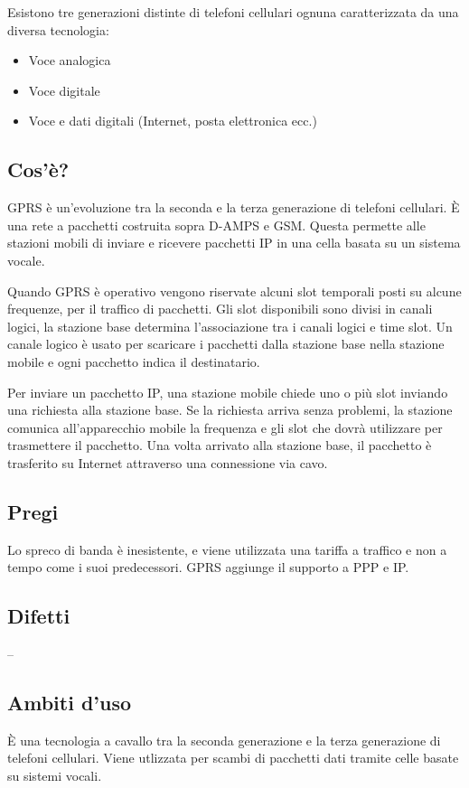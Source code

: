 Esistono tre generazioni distinte di telefoni cellulari ognuna caratterizzata da una diversa tecnologia:
\begin{itemize}
\item Voce analogica
\item Voce digitale
\item Voce e dati digitali (Internet, posta elettronica ecc.)
\end{itemize}
\subsection{Cos'è?}
GPRS è un'evoluzione tra la seconda e la terza generazione di telefoni cellulari.
È una rete a pacchetti costruita sopra D-AMPS e GSM.
Questa permette alle stazioni mobili di inviare e ricevere pacchetti IP in una cella basata su un sistema vocale.

Quando GPRS è operativo vengono riservate alcuni slot temporali posti su alcune frequenze, per il traffico di pacchetti.
Gli slot disponibili sono divisi in canali logici, la stazione base determina l'associazione tra i canali logici e time slot.
Un canale logico è usato per scaricare i pacchetti dalla stazione base nella stazione mobile e ogni pacchetto indica il destinatario.

Per inviare un pacchetto IP, una stazione mobile chiede uno o più slot inviando una richiesta alla stazione base.
Se la richiesta arriva senza problemi, la stazione comunica all'apparecchio mobile la frequenza e gli slot che dovrà utilizzare per trasmettere il pacchetto.
Una volta arrivato alla stazione base, il pacchetto è trasferito su Internet attraverso una connessione via cavo.

\subsection{Pregi}
Lo spreco di banda è inesistente, e viene utilizzata una tariffa a traffico e non a tempo come i suoi predecessori.
GPRS aggiunge il supporto a PPP e IP.

\subsection{Difetti}
--
\subsection{Ambiti d'uso}
\`E una tecnologia a cavallo tra la seconda generazione e la terza generazione di telefoni cellulari.
Viene utlizzata per scambi di pacchetti dati tramite celle basate su sistemi vocali.

